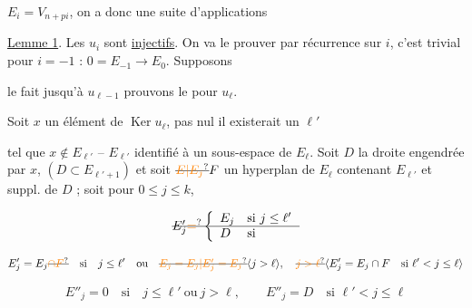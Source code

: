  $E_i=V_{n+pi}$, on a donc une suite d'applications


\uline{Lemme 1}. Les $u_i$ sont \uline{injectifs}.  On va le prouver par récurrence sur $i$, c'est trivial pour $i=-1$ : $0=E_{-1}\longrightarrow E_0$. Supposons



le fait jusqu'à $u_{\ell-1}$  prouvons le pour $u_\ell$.

 Soit $x$ un élément de $\operatorname{Ker}u_\ell$,   pas nul il existerait un    $\ell'$ 

tel que $x\notin E_{\ell'}$ -- $E_{\ell'}$ identifié à un sous-espace de $E_\ell$. Soit $D$ la droite engendrée par $x$,  $(D\subset E_{\ell'+1})$ et soit $\deleted{\unsure{E|E_j}}F$ un hyperplan de $E_\ell$  contenant $E_{\ell'}$ et suppl. de $D$ ; soit pour $0\leq j\leq k$,


\[\deleted{E'_j\unsure{=}\left\{\begin{array}{ll}E_j&\text{si }j\leq\ell'\\D&\text{si}\end{array}\right.}\]

\[E'_j=E_j\deleted{\unsure{\cap F}}\quad\text{si}\quad j\leq\ell'\quad\text{ou}\quad\deleted{\unsure{E_j=E_j|E'_j=E_j}}\inserted{j>\ell},\quad\deleted{\unsure{j>\ell}}\inserted{E'_j=E_j\cap F\quad\text{si }\ell'<j\leq\ell}\]

\[ E''_j=0\quad\text{si}\quad j\leq\ell'\ \text{ou}\ j>\ell,\qquad E''_j=D\quad\text{si }\ell'<j\leq\ell \]

